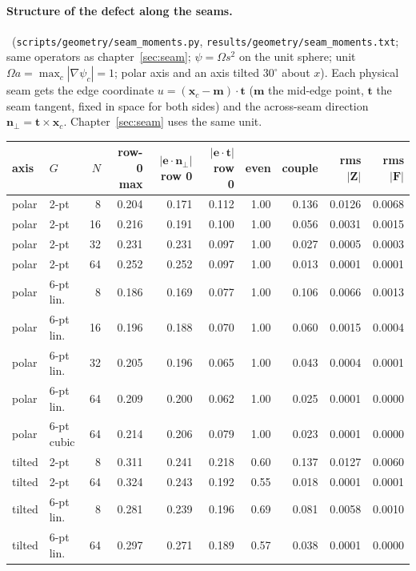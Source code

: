 \paragraph{Structure of the defect along the seams.}
\measured\ (\texttt{scripts/geometry/seam\_moments.py}, \texttt{results/geometry/seam\_moments.txt}; same operators
as chapter~\ref{sec:seam}; $\psi=\Omega s^2$ on the unit sphere; unit $\Omega a=\max_c|\nabla\psi_c|=1$; polar axis
and an axis tilted $30^\circ$ about $x$). Each physical seam gets the edge coordinate $u=(\bm x_c-\bm m)\cdot\bm t$
($\bm m$ the mid-edge point, $\bm t$ the seam tangent, fixed in space for both sides) and the across-seam direction
$\bm n_\perp=\bm t\times\bm x_c$. Chapter~\ref{sec:seam} uses the same unit.
\begin{center}\small\begin{tabular}{llrrrrrrrr}\toprule
axis & $G$ & $N$ & row-0 max & $|\bm e\cdot\bm n_\perp|$ row 0 & $|\bm e\cdot\bm t|$ row 0 & even & couple & rms$|\bm Z|$ & rms$|\bm F|$\\\midrule
polar & 2-pt & 8 & 0.204 & 0.171 & 0.112 & 1.00 & 0.136 & 0.0126 & 0.0068\\
polar & 2-pt & 16 & 0.216 & 0.191 & 0.100 & 1.00 & 0.056 & 0.0031 & 0.0015\\
polar & 2-pt & 32 & 0.231 & 0.231 & 0.097 & 1.00 & 0.027 & 0.0005 & 0.0003\\
polar & 2-pt & 64 & 0.252 & 0.252 & 0.097 & 1.00 & 0.013 & 0.0001 & 0.0001\\
polar & 6-pt lin.\ & 8 & 0.186 & 0.169 & 0.077 & 1.00 & 0.106 & 0.0066 & 0.0013\\
polar & 6-pt lin.\ & 16 & 0.196 & 0.188 & 0.070 & 1.00 & 0.060 & 0.0015 & 0.0004\\
polar & 6-pt lin.\ & 32 & 0.205 & 0.196 & 0.065 & 1.00 & 0.043 & 0.0004 & 0.0001\\
polar & 6-pt lin.\ & 64 & 0.209 & 0.200 & 0.062 & 1.00 & 0.025 & 0.0001 & 0.0000\\
polar & 6-pt cubic & 64 & 0.214 & 0.206 & 0.079 & 1.00 & 0.023 & 0.0001 & 0.0000\\
tilted & 2-pt & 8 & 0.311 & 0.241 & 0.218 & 0.60 & 0.137 & 0.0127 & 0.0060\\
tilted & 2-pt & 64 & 0.324 & 0.243 & 0.192 & 0.55 & 0.018 & 0.0001 & 0.0001\\
tilted & 6-pt lin.\ & 8 & 0.281 & 0.239 & 0.196 & 0.69 & 0.081 & 0.0058 & 0.0010\\
tilted & 6-pt lin.\ & 64 & 0.297 & 0.271 & 0.189 & 0.57 & 0.038 & 0.0001 & 0.0000\\
\bottomrule\end{tabular}\end{center}
